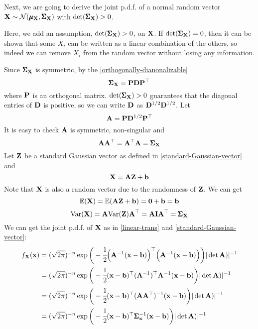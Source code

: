      Next, we are going to derive the joint p.d.f. of a normal random vector $\mathbf{X}\sim \mathcal{N}(\pmb{\mu}_{\mathbf{X}}, \pmb{\Sigma}_{\mathbf{X}})$ with $\det(\pmb{\Sigma}_{\mathbf{X}}) > 0$. 
    \begin{Rem}
        Here, we add an assumption, $\det(\pmb{\Sigma}_{\mathbf{X}}) > 0$, on $\mathbf{X}$. If $\det(\pmb{\Sigma}_{\mathbf{X}}) = 0$, then it can be shown that some $X_i$ can be written as a linear combination of the others, so indeed we can remove $X_i$ from the random vector without losing any information.
     \end{Rem}
     Since $\pmb{\Sigma}_{\mathbf{X}}$ is symmetric, by the \cref{orthogonally-dianonalizable}
     \begin{equation*}
         \pmb{\Sigma}_{\mathbf{X}} = \mathbf{P}\mathbf{D}\mathbf{P}^{\top}
     \end{equation*}
     where $\mathbf{P}$ is an orthogonal matrix. $\det(\pmb{\Sigma}_{\mathbf{X}}) > 0$ guarantees that the diagonal entries of $\mathbf{D}$ is positive, so we can write $\mathbf{D}$ as $\mathbf{D}^{1/2}\mathbf{D}^{1/2}$. Let 
     \begin{equation*}
         \mathbf{A} = \mathbf{P}\mathbf{D}^{1/2}\mathbf{P}^{\top}
     \end{equation*}
     It is easy to check $\mathbf{A}$ is symmetric, non-singular and 
     \begin{equation*}
         \mathbf{A}\mathbf{A}^{\top} = \mathbf{A}^{\top}\mathbf{A} = \pmb{\Sigma}_{\mathbf{X}} 
     \end{equation*}
     Let $\mathbf{Z}$ be a standard Gaussian vector as defined in \cref{standard-Gaussian-vector} and 
     \begin{equation*}
         \mathbf{X} = \mathbf{A}\mathbf{Z} + \mathbf{b}
     \end{equation*} Note that $\mathbf{X}$ is also a random vector due to the randomness of $\mathbf{Z}$. We can get
     \begin{equation*}
         \mathbb{E}(\mathbf{X}) = \mathbb{E}(\mathbf{A}\mathbf{Z} + \mathbf{b}) = \mathbf{0} + \mathbf{b} = \mathbf{b} 
     \end{equation*}
     \begin{equation*}
         \text{Var}(\mathbf{X}) = \mathbf{A}\text{Var}(\mathbf{Z})\mathbf{A}^{\top} = \mathbf{A}\mathbf{I}\mathbf{A}^{\top} = \pmb{\Sigma}_{\mathbf{X}}
     \end{equation*}
     We can get the joint p.d.f. of $\mathbf{X}$ as in \cref{linear-trans} and \cref{standard-Gaussian-vector}:
     \begin{align*}
         \pdfn{X} &=  (\sqrt{2\pi})^{-n}\exp\bigg(-\cfrac{1}{2}\T{\Big(\B{A}^{-1}(\B{x} - \B{b}) \Big)}
         \Big(\B{A}^{-1}(\B{x} - \B{b}) \Big) \bigg) |\det{\B{A}})|^{-1}\\
         & = (\sqrt{2\pi})^{-n}\exp\bigg(-\cfrac{1}{2} \T{(\B{x} - \B{b})}
         \T{(\B{A}^{-1})}\B{A}^{-1}
         (\B{x} - \B{b}) \bigg) |\det{\B{A}})|^{-1}\\
         & = (\sqrt{2\pi})^{-n}\exp\bigg(-\cfrac{1}{2} \T{(\B{x} - \B{b})}
         (\B{A}\T{\B{A}})^{-1}
         (\B{x} - \B{b}) \bigg) |\det{\B{A}})|^{-1}\\
         & = (\sqrt{2\pi})^{-n}\exp\bigg(-\cfrac{1}{2} \T{(\B{x} - \B{b})}
         \covmat_{\B{x}}^{-1}
         (\B{x} - \B{b}) \bigg) |\det{\B{A}})|^{-1}
     \end{align*}
